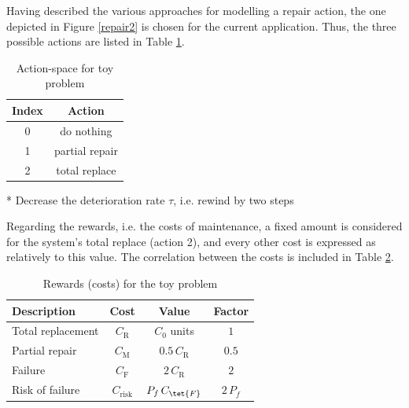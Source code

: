 Having described the various approaches for modelling a repair action, the one depicted in Figure \ref{repair2} is chosen for the current application. Thus, the three possible actions are listed in Table \ref{actToy}.

\begin{table}[H]
    \centering
    \caption{Action-space for toy problem}
    \label{actToy}
    \begin{threeparttable}
        \begin{tabular}{cc}
            \toprule
            \textbf{Index} & \textbf{Action} \\ \midrule
            0 & do nothing \\
            1 & partial repair\tnote{*} \\
            2 & total replace \\ \bottomrule
        \end{tabular}
        \begin{tablenotes}
            \item[*] \footnotesize{Decrease the deterioration rate $\tau$, i.e. rewind by two steps}
        \end{tablenotes}
    \end{threeparttable}
\end{table}


Regarding the rewards, i.e. the costs of maintenance, a fixed amount is considered for the system's total replace (action 2), and every other cost is expressed as relatively to this value. The correlation between the costs is included in Table \ref{costToy}.

\begin{table}[H]
    \centering
    \caption{Rewards (costs) for the toy problem}
    \label{costToy}
    \begin{tabular}{lccc}
        \toprule
        \textbf{Description} & \textbf{Cost} & \textbf{Value} & \textbf{Factor} \\ \midrule
        Total replacement & $C_{\text{R}}$ & $C_0$ units & $1$ \\ 
        Partial repair & $C_{\text{M}}$ & $0.5\, C_{\text{R}}$ & $0.5$ \\
        Failure & $C_{\text{F}}$ & $2\, C_{\text{R}}$ & $2$ \\ 
        Risk of failure & $C_{\text{risk}}$ & $P_f\,C_{\tet{F}}$ & $2\,P_f$ \\ \bottomrule
    \end{tabular}
\end{table}

